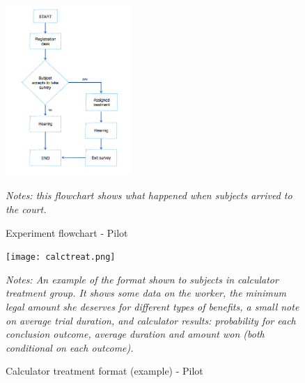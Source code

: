 \documentclass[11pt]{article}
\begin{document}
\begin{figure}[H]
   \caption{Experiment flowchart - Pilot}
   \label{treatment_flowchart}
    \begin{center}
    \includegraphics[width=0.42\textwidth]{./Figuras/Experiment_flowchart.png}
    \end{center}
    \footnotesize
    \textit{Notes: this flowchart shows what happened when subjects arrived to the court.}
\end{figure}
    



\begin{figure}[H]
    \caption{Calculator treatment format (example) - Pilot}
    \label{calc_template}
    \begin{center}
        \texttt{[image: calctreat.png]}
        \end{center}
        {\footnotesize \textit{Notes: An example of the format shown to subjects in calculator treatment group. It shows some data on the worker, the minimum legal amount she deserves for different types of benefits, a small note on average trial duration, and calculator results: probability for each conclusion outcome, average duration and amount won (both conditional on each outcome).}}
\end{figure}
\end{document}
